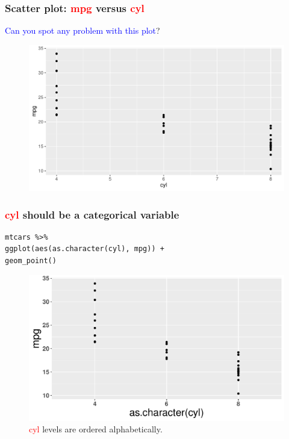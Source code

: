 \documentclass{beamer}
\begin{document}
\begin{frame}\frametitle{Scatter plot: \textcolor{red}{mpg} versus \textcolor{red}{cyl}}
\textcolor{blue}{Can you spot any problem with this plot}?
\begin{figure}
\includegraphics[width=0.99\linewidth]{PlotsLec2/mpg_vs_cyl}
\end{figure}
\end{frame}



\begin{frame}[fragile]\frametitle{\textcolor{red}{cyl} should be a categorical variable}
\lstset{basicstyle=\small\ttfamily}
\begin{lstlisting}
mtcars %>%
ggplot(aes(as.character(cyl), mpg)) +
geom_point()
\end{lstlisting}
\begin{figure}
\includegraphics[width=0.90\linewidth]{PlotsLec2/mpg_vs_cyl2}
\caption{{\small\textcolor{red}{cyl} levels are ordered alphabetically.}}
\end{figure}
\end{frame}
\end{document}
